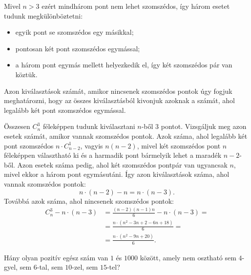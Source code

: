 \begin{solution}
Mivel $n>3$ ezért mindhárom pont nem lehet szomszédos, így három
esetet tudunk megkülönböztetni: 
\begin{itemize}
\item egyik pont se szomszédos egy másikkal; 
\item pontosan két pont szomszédos egymással; 
\item a három pont egymás mellett helyezkedik el, így két szomszédos pár
van köztük. 
\end{itemize}
Azon kiválasztások számát, amikor nincsenek szomszédos pontok úgy
fogjuk meghatározni, hogy az összes kiválasztásból kivonjuk azoknak
a számát, ahol legalább két pont szomszédos egymással.

Összesen $C_{n}^{3}$ féleképpen tudunk kiválasztani $n$-ből $3$
pontot. Vizsgáljuk meg azon esetek számát, amikor vannak szomszédos
pontok. Azok száma, ahol legalább két pont szomszédos $n\cdot C_{n-2}^{1}$,
vagyis $n(n-2)$, mivel két szomszédos pont $n$ féleképpen választható
ki és a harmadik pont bármelyik lehet a maradék $n-2$-ből. Azon esetek
száma pedig, ahol két szomszédos pontpár van ugyancsak $n$, mivel
ekkor a három pont egymásutáni. Így azon kiválasztások száma, ahol
vannak szomszédos pontok: 
\[
n\cdot(n-2)-n=n\cdot(n-3).
\]
Továbbá azok száma, ahol nincsenek szomszédos pontok: 
\begin{align*}
C_{n}^{3}-n\cdot(n-3) & =\frac{(n-2)(n-1)n}{6}-n\cdot(n-3)=\\
 & =\frac{n\cdot(n^{2}-3n+2-6n+18)}{6}=\\
 & =\frac{n\cdot(n^{2}-9n+20)}{6}.
\end{align*}
\end{solution}
\begin{extraproblem}
Hány olyan pozitív egész szám van $1$ és $1000$ között, amely nem
osztható sem $4$-gyel, sem $6$-tal, sem $10$-zel, sem $15$-tel? 
\end{extraproblem}

